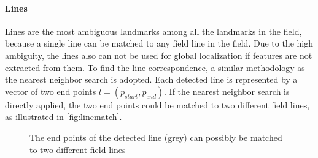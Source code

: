 \paragraph{Lines}
Lines are the most ambiguous landmarks among all the landmarks in the field, because a single line can be matched to any field line in the field. Due to the high ambiguity, the lines also can not be used for global localization if features are not extracted from them. To find the line correspondence, a similar methodology as the nearest neighbor search is adopted. Each detected line is represented by a vector of two end points $l=(p_{start}, p_{end})$. If the nearest neighbor search is directly applied, the two end points could be matched to two different field lines, as illustrated in \autoref{fig:linematch}.

\begin{figure}[h!]
\centering
{}
\caption{The end points of the detected line (grey) can possibly be matched to two different field lines}
\label{fig:linematch}
\end{figure}


